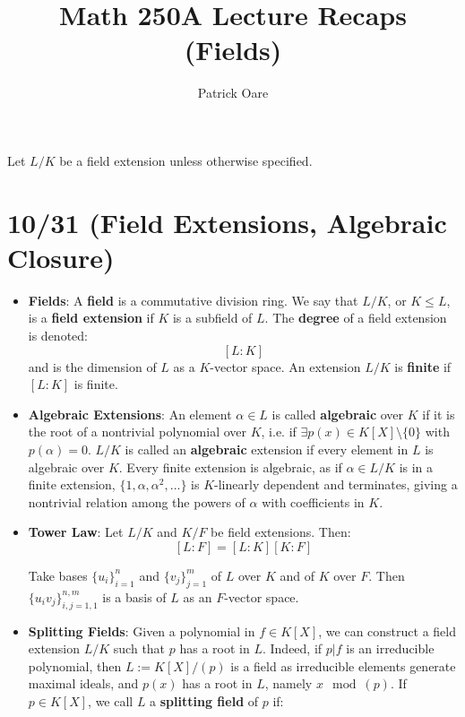\documentclass[11pt, oneside]{amsart}   	%
\title{Math 250A Lecture Recaps (Fields)}
\author{Patrick Oare}
\theoremstyle{definition}
\begin{document}
\maketitle

Let $L / K$ be a field extension unless otherwise specified.

\section{10/31 (Field Extensions, Algebraic Closure)}

\begin{itemize}

	\item \textbf{Fields}: A \textbf{field} is a commutative division ring. We say that $L / K$, or $K\leq L$, is a \textbf{field extension} if $K$ is a subfield 
	of $L$. The \textbf{degree} of a field extension is denoted:
	$$
		[L : K]
	$$
	and is the dimension of $L$ as a $K$-vector space. An extension $L / K$ is \textbf{finite} if $[L : K]$ is finite.
	
	\item \textbf{Algebraic Extensions}: An element $\alpha\in L$ is called \textbf{algebraic} over $K$ if it is the root of a nontrivial polynomial over $K$, 
	i.e. if $\exists p(x)\in K[X]\setminus \{0\}$ with $p(\alpha) = 0$. $L / K$ is called an \textbf{algebraic} extension if every element in $L$ is algebraic over 
	$K$. Every finite extension is algebraic, as if $\alpha\in L / K$ is in a finite extension, $\{1, \alpha, \alpha^2, ...\}$ is $K$-linearly dependent and 
	terminates, giving a nontrivial relation among the powers of $\alpha$ with coefficients in $K$.
	
	\item \textbf{Tower Law}: Let $L / K$ and $K / F$ be field extensions. Then:
	$$
		[L : F] = [L : K][K : F]
	$$
	
	Take bases $\{u_i\}_{i = 1}^n$ and $\{v_j\}_{j = 1}^m$ of $L$ over $K$ and of $K$ over $F$. Then $\{u_iv_j\}_{i, j = 1, 1}^{n, m}$ is a basis of $L$ as 
	an $F$-vector space.
	
	\item \textbf{Splitting Fields}: Given a polynomial in $f\in K[X]$, we can construct a field extension $L / K$ such that $p$ has a root in $L$. Indeed, if 
	$p | f$ is an irreducible polynomial, then $L := K[X] / (p)$ is a field as irreducible elements generate maximal ideals, and $p(x)$ has a root in $L$, 
	namely $x \mod(p)$. If $p\in K[X]$, we call $L$ a \textbf{splitting field} of $p$ if:
	

\end{itemize}
\end{document}
